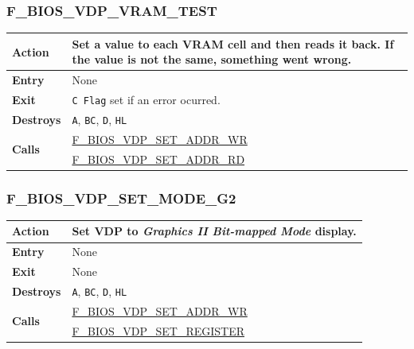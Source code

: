 \documentclass[a4paper,11pt]{article}
\begin{document}
        \subsubsection{F\_BIOS\_VDP\_VRAM\_TEST}
        \label{func:fbiosvdpvramtest}
        \begin{tabular}{l p{9cm}}
            \hline\textbf{Action}
            & Set a value to each \textbf{VRAM} cell and then reads it back. If
            the value is not the same, something went wrong. \\
            \hline\textbf{Entry} & None\\
            \hline\textbf{Exit} & \texttt{C Flag} set if an error ocurred.\\
            \hline\textbf{Destroys} & \texttt{A}, \texttt{BC}, \texttt{D},
            \texttt{HL} \\
            \hline\multirow[t]{2}{4em}{\textbf{Calls}}
            & \hyperref[func:fbiosvdpsetaddrwr]{F\_BIOS\_VDP\_SET\_ADDR\_WR}\\
            & \hyperref[func:fbiosvdpsetaddrrd]{F\_BIOS\_VDP\_SET\_ADDR\_RD}\\
            \hline
        \end{tabular}

        \subsubsection{F\_BIOS\_VDP\_SET\_MODE\_G2}
        \label{func:fbiosvdpsetmodeg2}
        \begin{tabular}{l p{9cm}}
            \hline\textbf{Action}
            & Set \textbf{VDP} to \textit{Graphics II Bit-mapped Mode} display.\\
            \hline\textbf{Entry} & None\\
            \hline\textbf{Exit} & None\\
            \hline\textbf{Destroys} & \texttt{A}, \texttt{BC}, \texttt{D},
            \texttt{HL} \\
            \hline\multirow[t]{2}{4em}{\textbf{Calls}}
            & \hyperref[func:fbiosvdpsetaddrwr]{F\_BIOS\_VDP\_SET\_ADDR\_WR}\\
            & \hyperref[func:fbiosvdpsetregister]{F\_BIOS\_VDP\_SET\_REGISTER}\\
            \hline
        \end{tabular}
\end{document}
